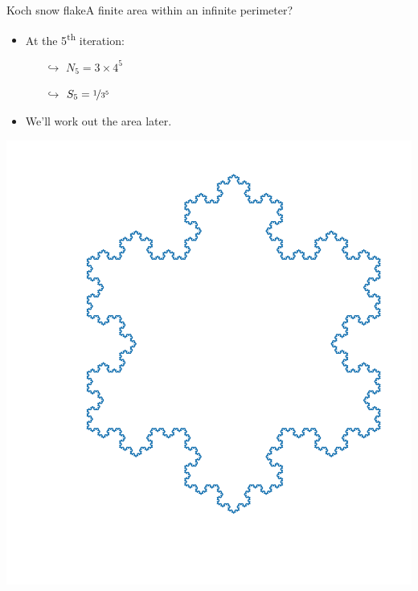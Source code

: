 \documentclass[usenames,dvipsnames,svgnames,10pt,aspectratio=169]{beamer}
\begin{document}
\begin{frame}[t, c]{Koch snow flake}{A finite area within an infinite perimeter?}
	\centering
	\begin{minipage}{.48\textwidth}
		\begin{itemize}
			\item At the 5\textsuperscript{th} iteration:
			\begin{itemize}
				\item[$\hookrightarrow$] $N_5 = 3 \times 4^5$
				\item[$\hookrightarrow$] $S_5 = \nicefrac{1}{3^5}$
			\end{itemize}

			\bigskip

			\item We'll work out the area later.
		\end{itemize}
	\end{minipage}%
	\hfill
	\begin{minipage}{.48\textwidth}
		\centering
		\includegraphics[width=.8\textwidth]{koch_5_it}
	\end{minipage}

	\vspace{1cm}
\end{frame}
\end{document}
